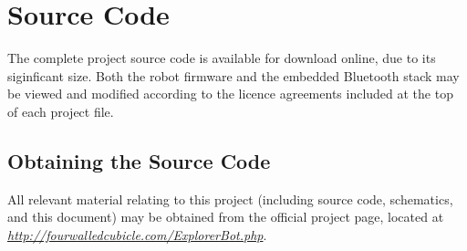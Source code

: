 \chapter{Source Code}
\label{Appendix B}

The complete project source code is available for download online, due to its siginficant size. Both the robot firmware and the embedded Bluetooth stack may be viewed and modified according to the licence agreements included at the top of each project file.

\section{Obtaining the Source Code}

All relevant material relating to this project (including source code, schematics, and this document) may be obtained from the official project page, located at \\ \href{http://fourwalledcubicle.com/ExplorerBot.php}{\textit{http://fourwalledcubicle.com/ExplorerBot.php}}.
